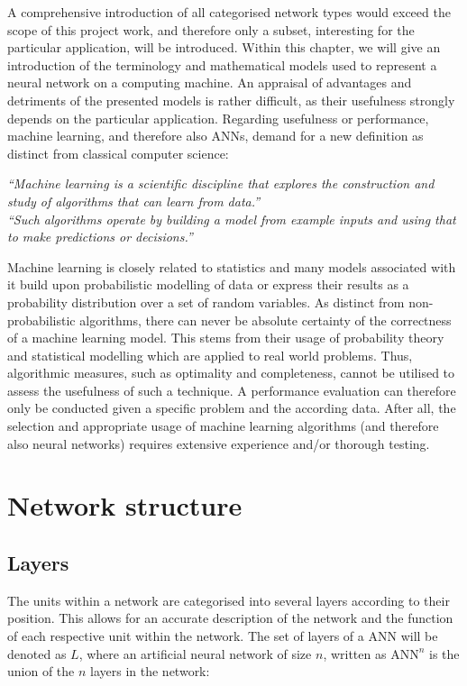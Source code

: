 \documentclass[10pt,a4paper,DIV=11]{scrreprt}
\begin{document}
A comprehensive introduction of all categorised network types would exceed the scope of this project work, and therefore only a subset,
interesting for the particular application, will be introduced. Within this chapter, we will give an introduction of the terminology and mathematical
models used to represent a neural network on a computing machine. An appraisal of advantages and detriments of the presented models is rather 
difficult, as their usefulness strongly depends on the particular application. Regarding usefulness or performance, machine learning, and therefore 
also ANNs, demand for a new definition as distinct from classical computer science:


\textit{“Machine learning is a scientific discipline that explores the construction and study of algorithms that can learn from data.”}\cite{MLDEF1}\\ 


\textit{“Such algorithms operate by building a model from example inputs and using that to make predictions or decisions.”} \cite{MLDEF2} 


Machine learning is closely related to statistics and many models associated with it build upon probabilistic modelling of data or express their 
results as a probability distribution over a set of random variables. As distinct from non-probabilistic algorithms, there can never be absolute 
certainty of the correctness of a machine learning model. This stems from their usage of probability theory and statistical modelling which are 
applied to real world problems. Thus, algorithmic measures, such as optimality and completeness, cannot be utilised to assess the usefulness of such a technique.
A performance evaluation can therefore only be conducted given a specific problem and the according data. After all, the selection and 
appropriate usage of machine learning algorithms (and therefore also neural networks) requires extensive experience and/or thorough testing. 

\section{Network structure}
\subsection{Layers}
The units within a network are categorised into several layers according to their position. This allows for an accurate description of the network 
and the function of each respective unit within the network. The set of layers of a ANN will be denoted as $L$, where an artificial neural network 
of size $n$, written as $\text{ANN}^n$ is the union of the $n$ layers in the network:
\end{document}
